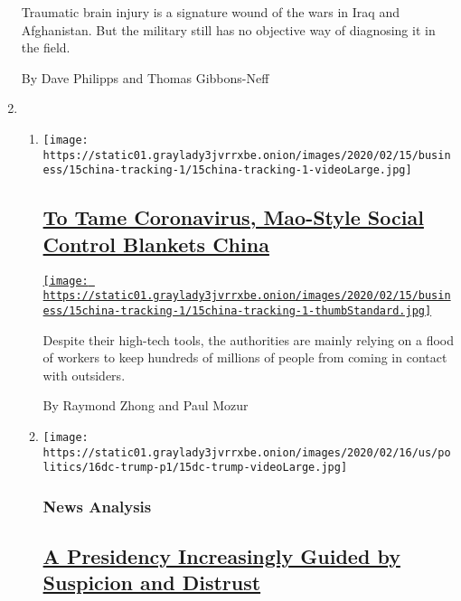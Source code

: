 \begin{enumerate}
  Traumatic brain injury is a signature wound of the wars in Iraq and
  Afghanistan. But the military still has no objective way of diagnosing
  it in the field.

  By Dave Philipps and Thomas Gibbons-Neff
\item
  \begin{enumerate}
  \def\labelenumii{\arabic{enumii}.}
  \item
    \texttt{[image: https://static01.graylady3jvrrxbe.onion/images/2020/02/15/business/15china-tracking-1/15china-tracking-1-videoLarge.jpg]}

    \hypertarget{to-tame-coronavirus-mao-style-social-control-blankets-china}{%
    \subsection{\texorpdfstring{\href{/2020/02/15/business/china-coronavirus-lockdown.html}{To
    Tame Coronavirus, Mao-Style Social Control Blankets
    China}}{To Tame Coronavirus, Mao-Style Social Control Blankets China}}\label{to-tame-coronavirus-mao-style-social-control-blankets-china}}

    \href{/2020/02/15/business/china-coronavirus-lockdown.html}{\texttt{[image: https://static01.graylady3jvrrxbe.onion/images/2020/02/15/business/15china-tracking-1/15china-tracking-1-thumbStandard.jpg]}}

    Despite their high-tech tools, the authorities are mainly relying on
    a flood of workers to keep hundreds of millions of people from
    coming in contact with outsiders.

    By Raymond Zhong and Paul Mozur
  \item
    \texttt{[image: https://static01.graylady3jvrrxbe.onion/images/2020/02/16/us/politics/16dc-trump-p1/15dc-trump-videoLarge.jpg]}

    \hypertarget{news-analysis}{%
    \subsubsection{News Analysis}\label{news-analysis}}

    \hypertarget{a-presidency-increasingly-guided-by-suspicion-and-distrust}{%
    \subsection{\texorpdfstring{\href{/2020/02/15/us/politics/trump-distrust-paranoia.html}{A
    Presidency Increasingly Guided by Suspicion and
    Distrust}}{A Presidency Increasingly Guided by Suspicion and Distrust}}\label{a-presidency-increasingly-guided-by-suspicion-and-distrust}}


\end{enumerate}
\end{enumerate}
